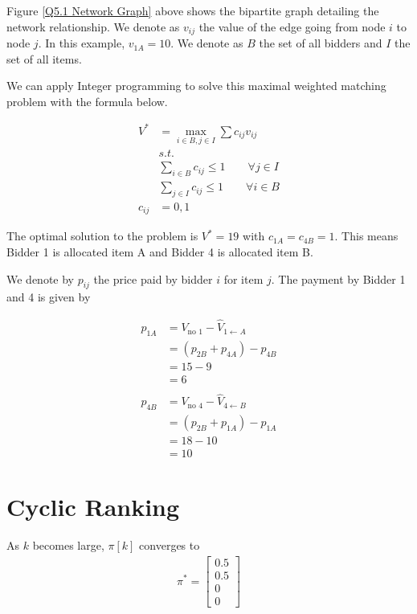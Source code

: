 \documentclass[]{article}
\begin{document}
Figure \ref{Q5.1 Network Graph} above shows the bipartite graph detailing the network relationship. We denote as $v_{ij}$ the value of the edge going from node $i$ to node $j$. In this example, $v_{1A} = 10$. We denote as $B$ the set of all bidders and $I$ the set of all items.

We can apply Integer programming to solve this maximal weighted matching problem with the formula below.

\begin{align*}
	V^* &= \underset{i \in B, j \in I}{\max} \sum c_{ij}v_{ij}\\
	&s.t. \\
	&\sum_{i \in B} c_{ij} \leq 1 \qquad \forall j \in I \\
	&\sum_{j \in I} c_{ij} \leq 1 \qquad \forall i \in B \\
	c_{ij} &= {0, 1}
\end{align*}

The optimal solution to the problem is $V^* = 19$ with $c_{1A} = c_{4B} = 1$. This means Bidder 1 is allocated item A and Bidder 4 is allocated item B.

We denote by $p_{ij}$ the price paid by bidder $i$ for item $j$. The payment by Bidder 1 and 4 is given by

\begin{align*}
	p_{1A} &= V_{\text{no } 1} - \hat{V}_{1 \leftarrow A} \\
		&= (p_{2B} + p_{4A}) - p_{4B} \\
		&= 15 - 9 \\
		&= 6 \\\\
	p_{4B} &= V_{\text{no } 4} - \hat{V}_{4 \leftarrow B} \\
		&= (p_{2B} + p_{1A}) - p_{1A} \\
		&= 18 - 10 \\
		&= 10
\end{align*}


\newpage
\section{Cyclic Ranking}

As $k$ becomes large, $\pi[k]$ converges to 
\begin{gather*}
	\pi^* = 
	\begin{bmatrix}
		0.5 \\
		0.5 \\
		0 \\
		0
	\end{bmatrix}
\end{gather*}
\end{document}
